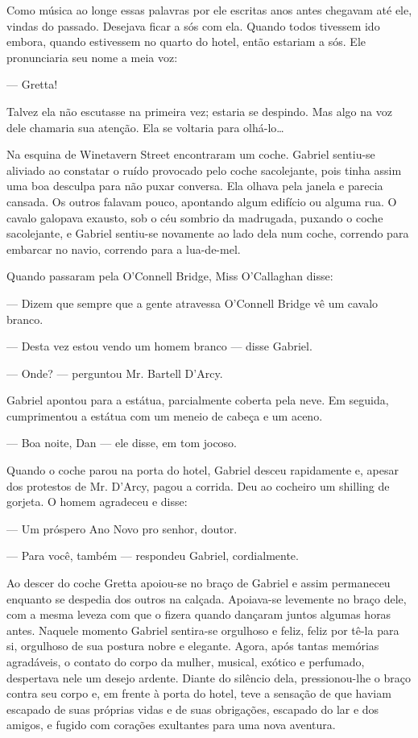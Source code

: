 Como música ao longe essas palavras por ele escritas anos antes
chegavam até ele, vindas do passado. Desejava ficar a sós com ela.
Quando todos tivessem ido embora, quando estivessem no quarto do
hotel, então estariam a sós. Ele pronunciaria seu nome a meia voz:

--- Gretta!

Talvez ela não escutasse na primeira vez; estaria se despindo. Mas
algo na voz dele chamaria sua atenção. Ela se voltaria para olhá-lo\ldots{}

Na esquina de Winetavern Street encontraram um coche. Gabriel
sentiu-se aliviado ao constatar o ruído provocado pelo coche
sacolejante, pois tinha assim uma boa desculpa para não puxar
conversa. Ela olhava pela janela e parecia cansada. Os outros falavam
pouco, apontando algum edifício ou alguma rua. O cavalo galopava
exausto, sob o céu sombrio da madrugada, puxando o coche
sacolejante, e Gabriel sentiu-se novamente ao lado dela num coche,
correndo para embarcar no navio, correndo para a lua-de-mel.

Quando passaram pela O'Connell Bridge, Miss O'Callaghan disse:

--- Dizem que sempre que a gente atravessa O'Connell Bridge vê um
cavalo branco.

--- Desta vez estou vendo um homem branco --- disse Gabriel.

--- Onde? --- perguntou Mr. Bartell D'Arcy.

Gabriel apontou para a estátua, parcialmente coberta pela neve. Em
seguida, cumprimentou a estátua com um meneio de cabeça e um aceno.

--- Boa noite, Dan --- ele disse, em tom jocoso.

Quando o coche parou na porta do hotel, Gabriel desceu rapidamente e,
apesar dos protestos de Mr. D'Arcy, pagou a
corrida. Deu ao cocheiro um shilling de gorjeta. O homem agradeceu e
disse:

--- Um próspero Ano Novo pro senhor, doutor.

--- Para você, também --- respondeu Gabriel, cordialmente.

Ao descer do coche Gretta apoiou-se no braço de Gabriel e assim
permaneceu enquanto se despedia dos outros na calçada. Apoiava-se
levemente no braço dele, com a mesma leveza com que o fizera quando
dançaram juntos algumas horas antes. Naquele momento Gabriel
sentira-se orgulhoso e feliz, feliz por tê-la para si, orgulhoso de
sua postura nobre e elegante. Agora, após tantas memórias agradáveis,
o contato do corpo da mulher, musical, exótico e perfumado,
despertava nele um desejo ardente. Diante do silêncio dela,
pressionou-lhe o braço contra seu corpo e, em frente à porta do
hotel, teve a sensação de que haviam escapado de suas próprias vidas e
de suas obrigações, escapado do lar e dos amigos, e fugido com
corações exultantes para uma nova aventura.

